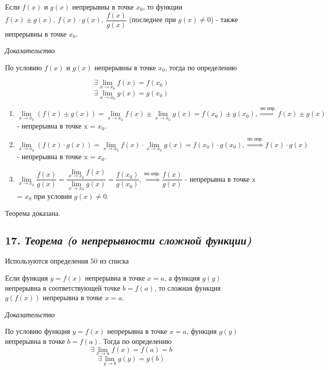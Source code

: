 Если $f(x)$ и $g(x)$ непрерывны в точке $x_0$, то функции $f(x) \pm g(x),\ f(x)\cdot g(x), \ {\dfrac{f(x)}{g(x)}}$ (последнее при $g(x) \neq 0$) - также непрерывны в точке $x_0$.
\vspace*{20pt} 

\textit{Доказательство}

По условию $f(x)$ и $g(x)$ непрерывны в точке $x_0$, тогда по определению

$$\exists\lim\limits_{x \to x_0}f(x) = f(x_0)$$ $$\exists\lim\limits_{x \to x_0}g(x) = g(x_0)$$
\begin{enumerate}

\item $\lim\limits_{x \to x_0}(f(x) \pm g(x)) = \lim\limits_{x \to x_0}f(x) \pm \lim\limits_{x \to x_0}g(x) = f(x_0) \pm g(x_0), \overset{\text{по опр.}}\Rightarrow f(x) \pm g(x)$ - непрерывна в точке x = $x_0$.
\item $\lim\limits_{x \to x_0}(f(x) \cdot g(x)) = \lim\limits_{x \to x_0}f(x) \cdot \lim\limits_{x \to x_0}g(x) = f(x_0) \cdot g(x_0), \overset{\text{по опр.}}\Rightarrow f(x) \cdot g(x)$ - непрерывна в точке x = $x_0$.
\item $\lim\limits_{x \to x_0}{\dfrac{f(x)}{g(x)}} = {\dfrac{\lim\limits_{x \to x_0}f(x)} {\lim\limits_{x \to x_0}g(x)}} = {\dfrac{f(x_0)}{g(x_0)}}, \overset{\text{по опр.}}\Rightarrow {\dfrac{f(x)}{g(x)}}$ - непрерывна в точке x = $x_0$ при условии $g(x) \neq 0$.

\end{enumerate}

Теорема доказана.
\newpage 
\subsection*{17. \textit{Теорема (о непрерывности сложной функции)}}
\begin{Quote2} 
\small\centering 

Используются определения 50 из списка \end{Quote2} 

Если функция $y = f(x)$ непрерывна в точке $x = a$, а функция $g(y)$ непрерывна в соответствующей точке $b = f(a)$, то сложная функция $g(f(x))$ непрерывна в точке $x = a$.
\vspace*{20pt} 

\textit{Доказательство}

По условию функция $y = f(x)$ непрерывна в точке $x = a$, функция $g(y)$ непрерывна в точке $b = f(a)$. Тогда по определению $$\exists\lim\limits_{x \to a}f(x) = f(a) = b$$ $$\exists\lim\limits_{y \to b}g(y) = g(b)$$

